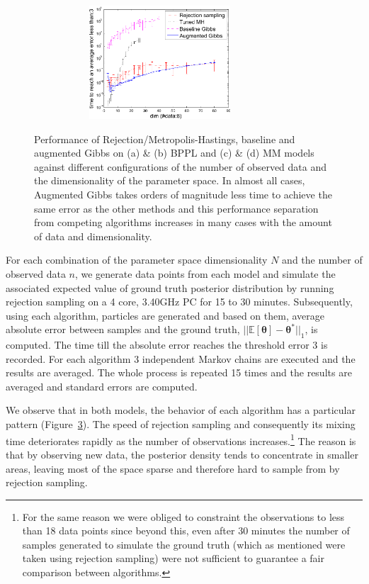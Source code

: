 \begin{figure}
\begin{subfigure}{.48\textwidth}
  \caption{}
  \label{fig:mmm_data_analysis}
\end{subfigure}
\begin{subfigure}{.48\textwidth}
  \centering
  \hspace{5mm} \includegraphics[width=0.8\textwidth,height=120pt]{plot/mmm_dim_analysis10.pdf}
  \caption{}
  \label{fig:mmm_dim_analysis}
\end{subfigure}
\caption{Performance of Rejection/Metropolis-Hastings, baseline and augmented Gibbs on (a) \& (b) BPPL and (c) \& (d) MM models against different configurations of the number of observed data and the dimensionality of the parameter space.  In almost all cases, Augmented Gibbs takes orders of magnitude less time to achieve the same error as the other methods and this performance separation from competing algorithms increases in many cases with the amount of data and dimensionality.}
\label{fig:results}
\end{figure}




For each combination of the parameter space dimensionality $N$ and the number 
of observed data $n$, we generate data points from each model and simulate the 
associated expected value of ground truth posterior distribution by running 
rejection sampling on a 4 core, 3.40GHz PC for 15 to 30 minutes.
Subsequently, using each algorithm, particles are generated and based on them, 
average absolute error between samples and the ground truth, $||\mathbb{E}[\boldsymbol\theta] - \boldsymbol\theta^*||_1$, is computed. 
The time till the absolute error reaches the threshold error 3 is recorded.
For each algorithm 3 independent Markov chains are executed and the results are averaged.
The whole process is repeated 15 times and the results are averaged and standard errors are computed. 


We observe that %
in both models, the behavior of each algorithm has a particular pattern 
(Figure~\ref{fig:results}). 
The speed of rejection sampling and consequently its mixing time deteriorates rapidly as the number of observations increases.\footnote{For the same reason we were obliged to constraint the observations to less than 18 data points since beyond this, even after 30 minutes the number of samples generated to simulate the ground truth (which as mentioned were taken using rejection sampling) were not sufficient to guarantee a fair comparison between algorithms.}
The reason is that by observing new data, the posterior density tends to concentrate in smaller areas, 
leaving most of the space sparse and therefore hard to sample from by rejection sampling.

